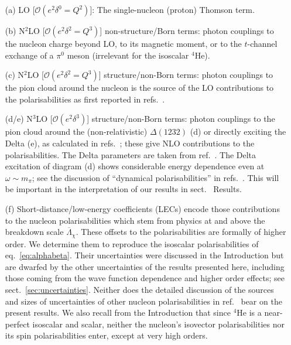 \documentclass[12pt]{article}
\newcommand{\fourHe}{${}^{4} \mathrm{He}$\xspace}
\newcommand{\3}{\ss}
\newcommand{\mpi}{\ensuremath{m_\pi}}
\newcommand{\NXLO}[1]{N\ensuremath{{}^{#1}}LO\xspace}
\newcommand{\Lambdachi}{\overline{\Lambda}_\chi}
\newcommand{\calO}{\mathcal{O}} \newcommand{\calP}{\mathcal{P}}
\numberwithin{equation}{section}
\begin{document}
\begin{itemize}

  \item[(a)] LO [$\calO(e^2\delta^0=Q^2)$]: The single-nucleon
    (proton) Thomson term.

  \item[(b)] \NXLO{2} [$\calO(e^2\delta^2=Q^3)$] non-structure/Born terms:
    photon couplings to the nucleon charge beyond LO, to its magnetic moment, or
    to the $t$-channel exchange of a $\pi^0$ meson (irrelevant for the isoscalar
    \fourHe).

  \item[(c)] \NXLO{2} [$\calO(e^2\delta^2=Q^3)$] structure/non-Born terms:
    photon couplings to the pion cloud around the nucleon is the source of the
    LO contributions to the polarisabilities as first reported in
    refs.~\cite{Bernard:1991rq, Bernard:1995dp}.

  \item[(d/e)] \NXLO{3} [$\calO(e^2\delta^3)$] structure/non-Born terms: photon
    couplings to the pion cloud around the (non-relativistic)
    $\Delta(1232)$ (d) or
    directly exciting the Delta (e), as calculated in
    refs.~\cite{Butler:1992ci, Hemmert:1996rw, Hemmert:1997tj};
    these give NLO contributions to
    the polarisabilities. The Delta parameters are taken from
    ref.~\cite{Margaryan:2018opu}. The Delta excitation of diagram (d) shows
    considerable energy dependence even at $\omega\sim\mpi$; see the discussion
    of ``dynamical polarisabilities'' in refs.~\cite{Griesshammer:2012we,
    Griesshammer:2017txw}. This will be important in the
    interpretation of our results in sect.~ \color{red}Results\color{black}.

  \item[(f)] Short-distance/low-energy coefficients (LECs) encode those
    contributions to the nucleon polarisabilities which stem from
    physics at and above the breakdown scale $\Lambdachi$. These
    offsets to the polarisabilities are formally of higher order. We
    determine them to reproduce the isoscalar polarisabilities of
    eq.~\eqref{eq:alphabeta}. Their
    uncertainties were discussed in the Introduction  but are dwarfed
    by the other uncertainties of the results presented
    here, including those coming from the wave function dependence and higher
    order effects; see sect.~\ref{sec:uncertainties}. Neither does
    the detailed discussion of the sources and sizes
    of uncertainties of other nucleon polarisabilities in
    ref.~\cite{Griesshammer:2015ahu}
    bear on the present results. We also recall from the Introduction
    that since \fourHe is a near-perfect isoscalar and
    scalar, neither the nucleon's isovector polarisabilities nor its spin
    polarisabilities enter, except at very high orders.

\end{itemize}
\end{document}

